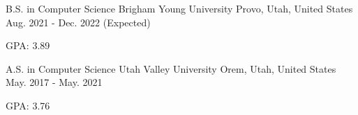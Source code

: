 

\begin{cventries}

  \cventry
    {B.S. in Computer Science} %
    {Brigham Young University} %
    {Provo, Utah, United States} %
    {Aug. 2021 - Dec. 2022 (Expected)} %
    {
      \begin{cvitems} %
        \item {GPA: 3.89}
      \end{cvitems}
    }
  
  \cventry
    {A.S. in Computer Science} %
    {Utah Valley University} %
    {Orem, Utah, United States} %
    {May. 2017 - May. 2021} %
    {
      \begin{cvitems} %
        \item {GPA: 3.76}
      \end{cvitems}
    }

\end{cventries}
